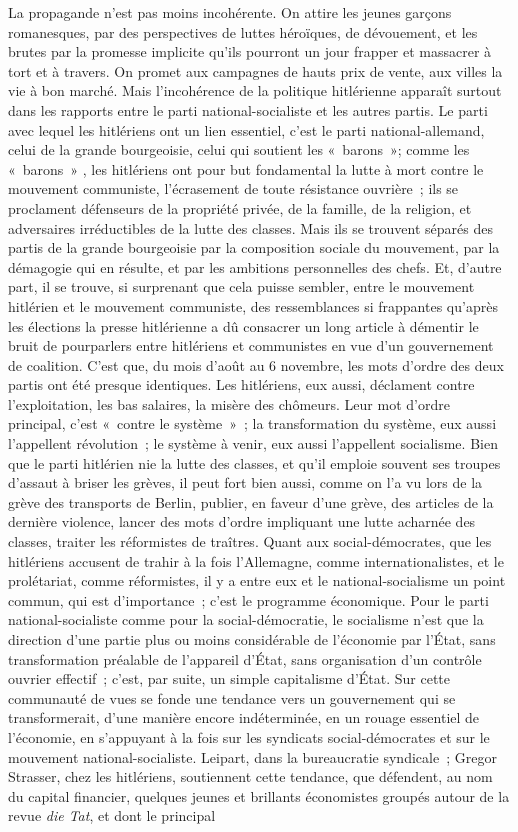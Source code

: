 \documentclass[french,twoside]{book} %
\begin{document}
La propagande n'est pas moins incohérente. On attire les jeunes garçons romanesques, par des perspectives de luttes héroïques, de dévouement, et les brutes par la promesse implicite qu'ils pourront un jour frapper et massacrer à tort et à travers. On promet aux campagnes de hauts prix de vente, aux villes la vie à bon marché. Mais l'incohérence de la politique hitlérienne apparaît surtout dans les rapports entre le parti national-socialiste et les autres partis. Le parti avec lequel les hitlériens ont un lien essentiel, c'est le parti national-allemand, celui de la grande bourgeoisie, celui qui soutient les « barons »; comme les « barons » , les hitlériens ont pour but fondamental la lutte à mort contre le mouvement communiste, l'écrasement de toute résistance ouvrière ; ils se proclament défenseurs de la propriété privée, de la famille, de la religion, et adversaires irréductibles de la lutte des classes. Mais ils se trouvent séparés des partis de la grande bourgeoisie par la composition sociale du mouvement, par la démagogie qui en résulte, et par les ambitions personnelles des chefs. Et, d'autre part, il se trouve, si surprenant que cela puisse sembler, entre le mouvement hitlérien et le mouvement communiste, des ressemblances si frappantes qu'après les élections la presse hitlérienne a dû consacrer un long article à démentir le bruit de pourparlers entre hitlériens et communistes en vue d'un gouvernement de coalition. C'est que, du mois d'août au 6 novembre, les mots d'ordre des deux partis ont été presque identiques. Les hitlériens, eux aussi, déclament contre l'exploitation, les bas salaires, la misère des chômeurs. Leur mot d'ordre principal, c'est « contre le système » ; la transformation du système, eux aussi l'appellent révolution ; le système à venir, eux aussi l'appellent socialisme. Bien que le parti hitlérien nie la lutte des classes, et qu'il emploie souvent ses troupes d'assaut à briser les grèves, il peut fort bien aussi, comme on l'a vu lors de la grève des transports de Berlin, publier, en faveur d'une grève, des articles de la dernière violence, lancer des mots d'ordre impliquant une lutte acharnée des classes, traiter les réformistes de traîtres. Quant aux social-démocrates, que les hitlériens accusent de trahir à la fois l'Allemagne, comme internationalistes, et le prolétariat, comme réformistes, il y a entre eux et le national-socialisme un point commun, qui est d'importan­ce ; c'est le programme économique. Pour le parti national-socialiste comme pour la social-démocratie, le socialisme n'est que la direction d'une partie plus ou moins considérable de l'économie par l'État, sans transformation préalable de l'appareil d'État, sans organisation d'un contrôle ouvrier effectif ; c'est, par suite, un simple capitalisme d'État. Sur cette communauté de vues se fonde une tendance vers un gouvernement qui se transformerait, d'une manière encore indéterminée, en un rouage essentiel de l'économie, en s'appuyant à la fois sur les syndicats social-démocrates et sur le mouvement national-socia­liste. Leipart, dans la bureaucratie syndicale ; Gregor Strasser, chez les hitlériens, soutiennent cette tendance, que défendent, au nom du capital financier, quelques jeunes et brillants économistes groupés autour de la revue {\itshape die Tat}, et dont le principal 
\end{document}
